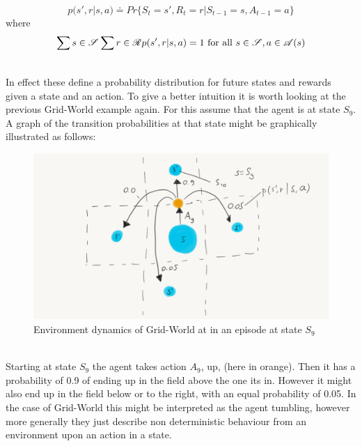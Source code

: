 \begin{equation}\label{MDP:prob_dist:0}
    p(s', r |s, a) \doteq Pr\{ S_t=s', R_t=r | S_{t-1}=s, A_{t-1}=a\}
\end{equation}
where 
\begin{equation}\label{MDP:prob_dist:1}
    \sum{s \in \mathscr{S}}^{}\sum{r \in \mathscr{R}}^{}  p(s', r |s, a) = 1 \mathrm{\ for\ all\ } s \in \mathscr{S}, a \in \mathscr{A}(s) 
\end{equation}
\centerline{\small{}}

\noindent
\\ In effect these define a probability distribution for future states and rewards given a state and an action. To give a better intuition it is worth looking at the previous Grid-World example again. For this assume that the agent is at state $S_9$. A graph of the transition probabilities at that state might be graphically illustrated as follows:

\begin{figure}[h!]
    \centering
    \includegraphics[width=0.5\linewidth]{figures/mdp_dynamics.png}
    \caption{Environment dynamics of Grid-World at in an episode at state $S_9$}
    \label{fig:mdp_dynamics}
\end{figure}

\noindent
\\ Starting at state $S_9$ the agent takes action $A_9$, up, (here in orange). Then it has a probability of 0.9 of ending up in the field above the one its in. However it might also end up in the field below or to the right, with an equal probability of 0.05. In the case of Grid-World this might be interpreted as the agent tumbling, however more generally they just describe non deterministic behaviour from an environment upon an action in a state.

